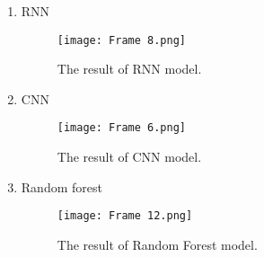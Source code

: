 \documentclass{ieeeojies}
\begin{document}
\begin{enumerate}
\item RNN
\begin{figure}[!ht]
      \centering
     \texttt{[image: Frame 8.png]} 
      \caption{The result of RNN model.}
      \label{fig:ten_anh}
    \end{figure}
    
\item CNN
\begin{figure}[!ht]
      \centering
      \texttt{[image: Frame 6.png]} 
      \caption{The result of CNN model.}
      \label{fig:ten_anh}
    \end{figure} 
    
\item Random forest
\begin{figure}[!ht]
      \centering
     \texttt{[image: Frame 12.png]} 
      \caption{The result of Random Forest model.}
      \label{fig:ten_anh}
    \end{figure}  
\end{enumerate}
\end{document}

